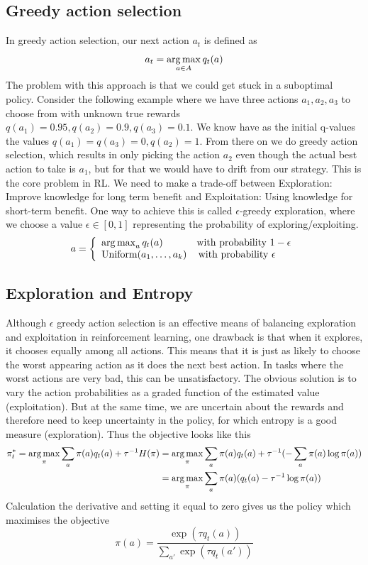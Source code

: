 \subsection{Greedy action selection}
In greedy action selection, our next action $a_t$ is defined as $$a_t = \operatorname*{arg\,max}\limits_{a\in 
A} q_t(a)$$ The problem with this approach is that we could get stuck in a suboptimal 
policy. Consider the following example where we have three actions $a_1,a_2,a_3$ to choose 
from with unknown true rewards ${q(a_1)=0.95,q(a_2)=0.9,q(a_3)=0.1}$. We know have as the 
initial q-values the values \newline ${q(a_1)= q(a_3) = 0,q(a_2)=1}$. From there on we do 
greedy action selection, which results in only picking the action $a_2$ even though the 
actual best action to take is $a_1$, but for that we would have to drift from our strategy. 
This is the core problem in RL. We need to make a trade-off between Exploration: Improve 
knowledge for long term benefit and Exploitation: Using knowledge for short-term benefit. 
One way to achieve this is called $\epsilon$-greedy exploration, 
where we choose a value $\epsilon \in [0,1]$ representing the probability of 
exploring/exploiting.
$$ a = \left\{
\begin{array}{ll}
\operatorname*{arg\,max}_a q_t(a) & \text{with probability } 1-\epsilon \\
\text{Uniform}({a_1,\dots,a_k}) & \, \text{with probability } \epsilon\\
\end{array}
\right.$$

\subsection{Exploration and Entropy}
Although $\epsilon$ greedy action selection is an effective means of balancing exploration 
and exploitation in reinforcement learning, one 
drawback is that when it explores, it chooses equally among all actions. 
This means that it is just as likely to choose the worst appearing 
action as it does the next best action. In tasks where the worst actions are very bad, this 
can be unsatisfactory. The obvious solution is to vary the action probabilities as a  
graded function of the estimated value (exploitation). But at the same time, we are 
uncertain about the rewards and therefore need to keep uncertainty in the policy, for which 
entropy is a good measure (exploration). Thus the objective looks like this 
\begin{align*}
    \pi^*_t = \operatorname*{arg\,max}\limits_\pi \sum_a \pi(a) q_t(a) + \tau^{-1}H(\pi) &=\operatorname*{arg\,max}\limits_\pi \sum_a \pi(a) q_t(a) + \tau^{-1} (- \sum_a \pi(a)\log{\pi(a)})\\   &=\operatorname*{arg\,max}\limits_\pi \sum_a \pi(a)(q_t(a)-\tau^{-1}\log{\pi(a)})
\end{align*}
Calculation the derivative and setting it equal to zero gives us the policy which maximises the objective $$ \pi(a)= \frac{\exp(\tau q_t(a))}{\sum_{a'}\exp(\tau q_t(a'))}$$

